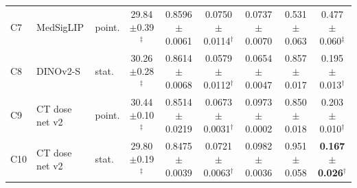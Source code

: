 \begin{table}[t]
\begin{tabular}{lllcccccc}
C7 & MedSigLIP & point. & 29.84$\pm$0.39$^{\ddagger}$ & 0.8596$\pm$0.0061 & 0.0750$\pm$0.0114$^{\dagger}$ & 0.0737$\pm$0.0070 & 0.531$\pm$0.063 & 0.477$\pm$0.060$^{\ddagger}$ \\
C8 & DINOv2-S & stat. & 30.26$\pm$0.28$^{\ddagger}$ & 0.8614$\pm$0.0068 & 0.0579$\pm$0.0112$^{\dagger}$ & 0.0654$\pm$0.0047 & 0.857$\pm$0.017 & 0.195$\pm$0.013$^{\dagger}$ \\
C9 & CT dose net v2 & point. & 30.44$\pm$0.10$^{\ddagger}$ & 0.8514$\pm$0.0219 & 0.0673$\pm$0.0031$^{\dagger}$ & 0.0973$\pm$0.0002 & 0.850$\pm$0.018 & 0.203$\pm$0.010$^{\dagger}$ \\
C10 & CT dose net v2 & stat. & 29.80$\pm$0.19$^{\ddagger}$ & 0.8475$\pm$0.0039 & 0.0721$\pm$0.0063$^{\dagger}$ & 0.0982$\pm$0.0036 & 0.951$\pm$0.058 & \textbf{0.167$\pm$0.026}$^{\dagger}$ \\
\bottomrule
\end{tabular}
\end{table}
